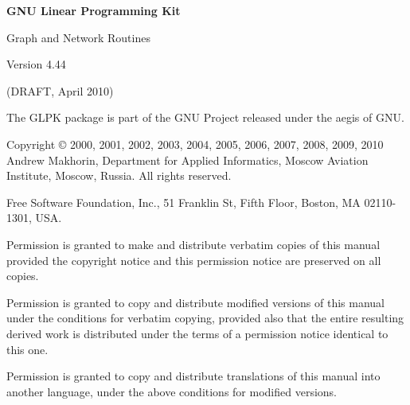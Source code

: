 \documentclass[dvipdfm,11pt]{report}
\begin{document}
\thispagestyle{empty}

\begin{center}

\vspace*{1in}

\begin{huge}
\sf\bfseries GNU Linear Programming Kit
\end{huge}

\vspace{0.5in}

\begin{LARGE}
\sf Graph and Network Routines
\end{LARGE}

\vspace{0.5in}

\begin{LARGE}
\sf Version 4.44
\end{LARGE}

\vspace{0.5in}
\begin{Large}
\sf (DRAFT, April 2010)
\end{Large}
\end{center}

\newpage

\vspace*{1in}

\vfill

\noindent
The GLPK package is part of the GNU Project released under the aegis of
GNU.

\medskip \noindent
Copyright \copyright{} 2000, 2001, 2002, 2003, 2004, 2005, 2006, 2007,
2008, 2009, 2010 Andrew Makhorin, Department for Applied Informatics,
Moscow Aviation Institute, Moscow, Russia. All rights reserved.

\medskip \noindent
Free Software Foundation, Inc., 51 Franklin St, Fifth Floor, Boston, MA
02110-1301, USA.

\medskip \noindent
Permission is granted to make and distribute verbatim copies of this
manual provided the copyright notice and this permission notice are
preserved on all copies.

\medskip \noindent
Permission is granted to copy and distribute modified versions of this
manual under the conditions for verbatim copying, provided also that the
entire resulting derived work is distributed under the terms of
a permission notice identical to this one.

\medskip \noindent
Permission is granted to copy and distribute translations of this manual
into another language, under the above conditions for modified versions.
\end{document}
